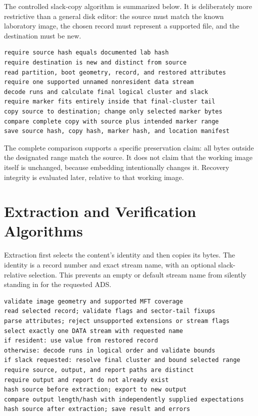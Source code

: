 The controlled slack-copy algorithm is summarized below. It is deliberately
more restrictive than a general disk editor: the source must match the known
laboratory image, the chosen record must represent a supported file, and
the destination must be new.
\begin{lstlisting}
require source hash equals documented lab hash
require destination is new and distinct from source
read partition, boot geometry, record, and restored attributes
require one supported unnamed nonresident data stream
decode runs and calculate final logical cluster and slack
require marker fits entirely inside that final-cluster tail
copy source to destination; change only selected marker bytes
compare complete copy with source plus intended marker range
save source hash, copy hash, marker hash, and location manifest
\end{lstlisting}
The complete comparison supports a specific preservation claim: all bytes
outside the designated range match the source. It does not claim that the
working image itself is unchanged, because embedding intentionally changes it.
Recovery integrity is evaluated later, relative to that working image.

\section{Extraction and Verification Algorithms}
Extraction first selects the content's identity and then copies its bytes.
The identity is a record number and exact stream name, with an optional
slack-relative selection. This prevents an empty or default stream name from
silently standing in for the requested ADS.
\noindent\begin{minipage}{\linewidth}
\begin{lstlisting}
validate image geometry and supported MFT coverage
read selected record; validate flags and sector-tail fixups
parse attributes; reject unsupported extensions or stream flags
select exactly one DATA stream with requested name
if resident: use value from restored record
otherwise: decode runs in logical order and validate bounds
if slack requested: resolve final cluster and bound selected range
require source, output, and report paths are distinct
require output and report do not already exist
hash source before extraction; export to new output
compare output length/hash with independently supplied expectations
hash source after extraction; save result and errors
\end{lstlisting}
\end{minipage}

